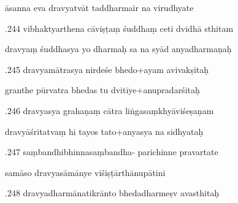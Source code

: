 \documentclass[article,12pt,a4paper]{memoir}%
\newcounter{parCount}
\begin{document}
	  
	  \pstart \leavevmode%
	āsanna eva dravyatvāt taddharmair na virudhyate 
	{}
	\pend%
      

	  
	  \pstart {}.244 vibhaktyarthena cāviṣṭaṃ śuddhaṃ ceti dvidhā sthitam 
	{}
	\pend%
      

	  
	  \pstart \leavevmode%
	dravyaṃ śuddhasya yo dharmaḥ sa na syād anyadharmaṇaḥ 
	{}
	\pend%
      

	  
	  \pstart {}.245 dravyamātrasya nirdeśe bhedo+ayam avivakṣitaḥ 
	{}
	\pend%
      

	  
	  \pstart \leavevmode%
	granthe pūrvatra bhedas tu dvitīye+anupradarśitaḥ 
	{}
	\pend%
      

	  
	  \pstart {}.246 dravyasya grahaṇaṃ cātra   liṅgasaṃkhyāviśeṣaṇam 
	{}
	\pend%
      

	  
	  \pstart \leavevmode%
	dravyāśritatvaṃ hi tayos tato+anyasya na sidhyataḥ 
	{}
	\pend%
      

	  
	  \pstart {}.247 saṃbandhibhinnasaṃbandha- parichinne pravartate 
	{}
	\pend%
      

	  
	  \pstart \leavevmode%
	samāso dravyasāmānye viśiṣṭārthānupātini 
	{}
	\pend%
      

	  
	  \pstart {}.248 dravyadharmānatikrānto bhedadharmeṣv avasthitaḥ 
	{}
	\pend%
      
\end{document}
